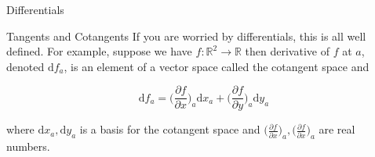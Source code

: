 \documentclass{beamer}
\begin{document}
\begin{frame}[fragile]{Differentials}
\end{frame}

\begin{frame}[fragile]{Tangents and Cotangents}
  If you are worried by differentials, this is all well defined. For
  example, suppose we have $f : \mathbb{R}^2 \rightarrow \mathbb{R}$
  then derivative of $f$ at $a$, denoted $\mathrm{d}f_a$, is an
  element of a vector space called the cotangent space and

$$
\mathrm{d}f_a = \bigg(\frac{\partial f}{\partial x}\bigg)_a\mathrm{d}x_a +
                \bigg(\frac{\partial f}{\partial y}\bigg)_a\mathrm{d}y_a
$$

where $\mathrm{d}x_a, \mathrm{d}y_a$ is a basis for the cotangent
space and $\big(\frac{\partial f}{\partial x}\big)_a,
\big(\frac{\partial f}{\partial x}\big)_a$ are real numbers.
\end{frame}
\end{document}
